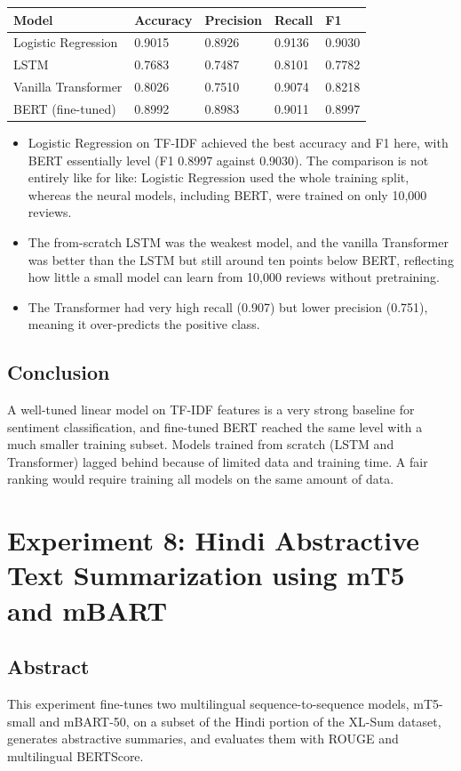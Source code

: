 \documentclass[12pt,a4paper,oneside]{report}
\providecommand{\tightlist}{\setlength{\itemsep}{0pt}\setlength{\parskip}{0pt}}
\begin{document}
\begin{longtable}[]{@{}lllll@{}}
\toprule\noalign{}
Model & Accuracy & Precision & Recall & F1 \\
\midrule\noalign{}
\endhead
\bottomrule\noalign{}
\endlastfoot
Logistic Regression & 0.9015 & 0.8926 & 0.9136 & 0.9030 \\
LSTM & 0.7683 & 0.7487 & 0.8101 & 0.7782 \\
Vanilla Transformer & 0.8026 & 0.7510 & 0.9074 & 0.8218 \\
BERT (fine-tuned) & 0.8992 & 0.8983 & 0.9011 & 0.8997 \\
\end{longtable}

\begin{itemize}
\tightlist
\item
  Logistic Regression on TF-IDF achieved the best accuracy and F1 here, with BERT essentially level (F1 0.8997 against 0.9030). The comparison is not entirely like for like: Logistic Regression used the whole training split, whereas the neural models, including BERT, were trained on only 10,000 reviews.
\item
  The from-scratch LSTM was the weakest model, and the vanilla Transformer was better than the LSTM but still around ten points below BERT, reflecting how little a small model can learn from 10,000 reviews without pretraining.
\item
  The Transformer had very high recall (0.907) but lower precision (0.751), meaning it over-predicts the positive class.
\end{itemize}


\section{Conclusion}
A well-tuned linear model on TF-IDF features is a very strong baseline for sentiment classification, and fine-tuned BERT reached the same level with a much smaller training subset. Models trained from scratch (LSTM and Transformer) lagged behind because of limited data and training time. A fair ranking would require training all models on the same amount of data.


\chapter{Experiment 8: Hindi Abstractive Text Summarization using mT5 and mBART}
\section{Abstract}
This experiment fine-tunes two multilingual sequence-to-sequence models, mT5-small and mBART-50, on a subset of the Hindi portion of the XL-Sum dataset, generates abstractive summaries, and evaluates them with ROUGE and multilingual BERTScore.
\end{document}
